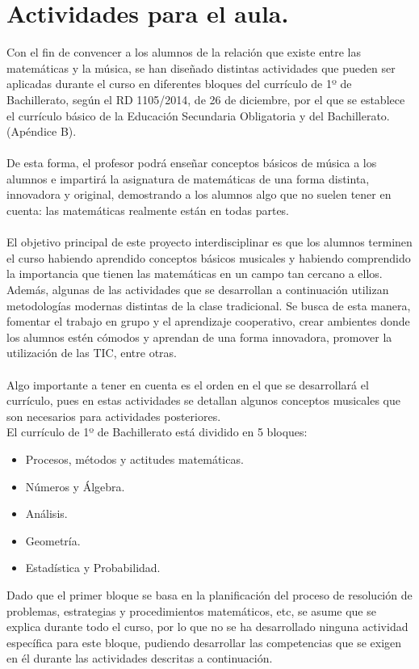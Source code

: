 \documentclass[a4paper, openright, 11pt, titlepage]{report}
\theoremstyle{definition}\newtheorem{defin}[propo]{Definition}
\theoremstyle{definition}\newtheorem{obser}[propo]{Remark}
\theoremstyle{definition}\newtheorem{ejem}[propo]{Ejemplo}
\theoremstyle{definition}\newtheorem{algoritmo}[propo]{Algoritmo}
\begin{document}
\chapter{Actividades para el aula.}
Con el fin de convencer a los alumnos de la relación que existe entre las matemáticas y la música, se han diseñado distintas actividades que pueden ser aplicadas durante el curso en diferentes bloques del currículo de 1º de Bachillerato, según el RD 1105/2014, de 26 de diciembre, por el que se establece el currículo básico de la Educación Secundaria Obligatoria y del Bachillerato. (Apéndice B).\\\\
De esta forma, el profesor podrá enseñar conceptos básicos de música a los alumnos e impartirá la asignatura de matemáticas de una forma distinta, innovadora y original, demostrando a los alumnos algo que no suelen tener en cuenta: las matemáticas realmente están en todas partes.\\\\
El objetivo principal de este proyecto interdisciplinar es que los alumnos terminen el curso habiendo aprendido conceptos básicos musicales y habiendo comprendido la importancia que tienen las matemáticas en un campo tan cercano a ellos. Además, algunas de las actividades que se desarrollan a continuación utilizan metodologías modernas distintas de la clase tradicional. Se busca de esta manera, fomentar el trabajo en grupo y el aprendizaje cooperativo, crear ambientes donde los alumnos estén cómodos y aprendan de una forma innovadora, promover la utilización de las TIC, entre otras.\\\\
Algo importante a tener en cuenta es el orden en el que se desarrollará el currículo, pues en estas actividades se detallan algunos conceptos musicales que son necesarios para actividades posteriores.\\
El currículo de 1º de Bachillerato está dividido en 5 bloques:
\begin{itemize}
    \item Procesos, métodos y actitudes matemáticas.
    \item Números y Álgebra.
    \item Análisis.
    \item Geometría.
    \item Estadística y Probabilidad.
\end{itemize}
Dado que el primer bloque se basa en la planificación del proceso de resolución de problemas, estrategias y procedimientos matemáticos, etc, se asume que se explica durante todo el curso, por lo que no se ha desarrollado ninguna actividad específica para este bloque, pudiendo desarrollar las competencias que se exigen en él durante las actividades descritas a continuación.
\end{document}
